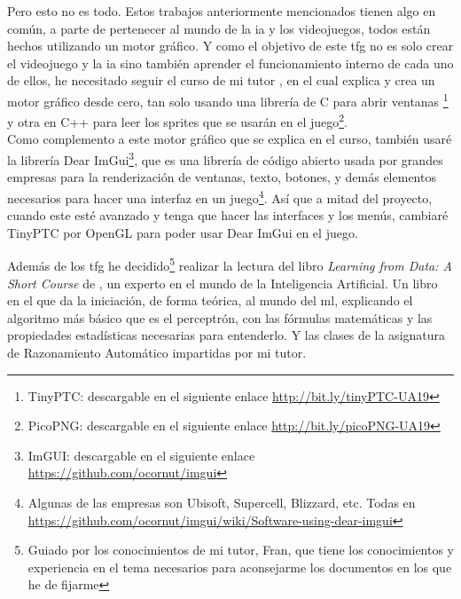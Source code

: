 Pero esto no es todo. Estos trabajos anteriormente mencionados tienen algo en común, a parte de pertenecer al mundo de la \gls{ia} y los videojuegos, todos están hechos utilizando un motor gráfico. Y como el objetivo de este \gls{tfg} no es solo crear el videojuego y la \gls{ia} sino también aprender el funcionamiento interno de cada uno de ellos, he necesitado seguir el curso de mi tutor \cite{CursoMotorC++} , en el cual explica y crea un motor gráfico desde cero, tan solo usando una librería de C para abrir ventanas \footnote{TinyPTC: descargable en el siguiente enlace \url{http://bit.ly/tinyPTC-UA19}} y otra en C++ para leer los sprites que se usarán en el juego\footnote{PicoPNG: descargable en el siguiente enlace \url{http://bit.ly/picoPNG-UA19}}.
\\
Como complemento a este motor gráfico que se explica en el curso, también usaré la librería Dear ImGui\footnote{ImGUI: descargable en el siguiente enlace \url{https://github.com/ocornut/imgui}}, que es una librería de código abierto usada por grandes empresas para la renderización de ventanas, texto, botones, y demás elementos necesarios para hacer una interfaz en un juego\footnote{Algunas de las empresas son Ubisoft, Supercell, Blizzard, etc. Todas en \url{https://github.com/ocornut/imgui/wiki/Software-using-dear-imgui}}. Así que a mitad del proyecto, cuando este esté avanzado y tenga que hacer las interfaces y los menús, cambiaré TinyPTC por OpenGL para poder usar Dear ImGui en el juego.

Además de los \gls{tfg} he decidido\footnote{Guiado por los conocimientos de mi tutor, Fran, que tiene los conocimientos y experiencia en el tema necesarios para aconsejarme los documentos en los que he de fijarme} realizar la lectura del libro \textit{Learning from Data: A Short Course} de , un experto en el mundo de la Inteligencia Artificial. Un libro en el que da la iniciación, de forma teórica, al mundo del \gls{ml}, explicando el algoritmo más básico que es el perceptrón, con las fórmulas matemáticas y las propiedades estadísticas necesarias para entenderlo. Y las clases de la asignatura de Razonamiento Automático impartidas por mi tutor.

